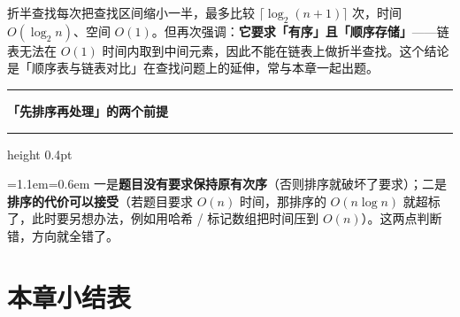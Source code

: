 \documentclass[11pt,openany,UTF8]{ctexbook}
\newcommand{\callouthead}[2]{%
  \par\addvspace{7pt}\noindent
  {\color{#1}\rule[-0.15em]{3pt}{1.05em}}\hspace{0.5em}%
  {\bfseries\color{#1}#2}\par\nobreak\vspace{-0.35em}%
  {\color{rulesep}\hrule height 0.4pt}\nobreak\vspace{0.45em}%
  \begingroup\small\setlength{\parindent}{0pt}%
  \leftskip=1.1em\rightskip=0.6em\noindent\ignorespaces}
\newcommand{\calloutend}{\par\endgroup\addvspace{7pt}}
\newenvironment{callwarn}[1]{\callouthead{warnbar}{#1}}{\calloutend}
\begin{document}
折半查找每次把查找区间缩小一半，最多比较 $\lceil \log_2(n+1) \rceil$ 次，时间 $O(\log_2 n)$、空间 $O(1)$。但再次强调：\textbf{它要求「有序」且「顺序存储」}——链表无法在 $O(1)$ 时间内取到中间元素，因此不能在链表上做折半查找。这个结论是「顺序表与链表对比」在查找问题上的延伸，常与本章一起出题。

\begin{callwarn}{「先排序再处理」的两个前提}
一是\textbf{题目没有要求保持原有次序}（否则排序就破坏了要求）；二是\textbf{排序的代价可以接受}（若题目要求 $O(n)$ 时间，那排序的 $O(n\log n)$ 就超标了，此时要另想办法，例如用哈希 / 标记数组把时间压到 $O(n)$）。这两点判断错，方向就全错了。

\end{callwarn}

\section*{本章小结表}
\end{document}
